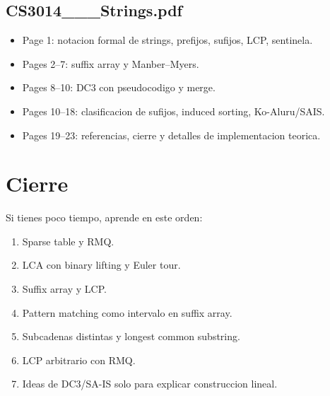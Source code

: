 \documentclass[10pt]{article}
\begin{document}
\subsection*{CS3014\_\_\_Strings.pdf}
\begin{itemize}[leftmargin=*]
\item Page 1: notacion formal de strings, prefijos, sufijos, LCP, sentinela.
\item Pages 2--7: suffix array y Manber--Myers.
\item Pages 8--10: DC3 con pseudocodigo y merge.
\item Pages 10--18: clasificacion de sufijos, induced sorting, Ko-Aluru/SAIS.
\item Pages 19--23: referencias, cierre y detalles de implementacion teorica.
\end{itemize}



\section*{Cierre}
Si tienes poco tiempo, aprende en este orden:
\begin{enumerate}[leftmargin=*]
\item Sparse table y RMQ.
\item LCA con binary lifting y Euler tour.
\item Suffix array y LCP.
\item Pattern matching como intervalo en suffix array.
\item Subcadenas distintas y longest common substring.
\item LCP arbitrario con RMQ.
\item Ideas de DC3/SA-IS solo para explicar construccion lineal.
\end{enumerate}
\end{document}

